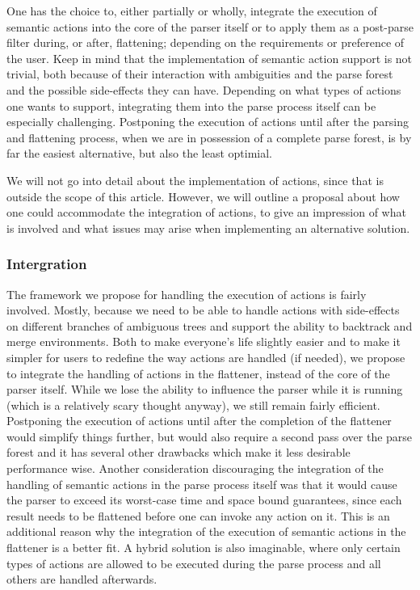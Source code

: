 \documentclass[a4paper,10pt]{article}
\begin{document}
One has the choice to, either partially or wholly, integrate the execution of semantic actions into the core of the parser itself or to apply them as a post-parse filter during, or after, flattening; depending on the requirements or preference of the user. Keep in mind that the implementation of semantic action support is not trivial, both because of their interaction with ambiguities and the parse forest and the possible side-effects they can have. Depending on what types of actions one wants to support, integrating them into the parse process itself can be especially challenging. Postponing the execution of actions until after the parsing and flattening process, when we are in possession of a complete parse forest, is by far the easiest alternative, but also the least optimial.

We will not go into detail about the implementation of actions, since that is outside the scope of this article. However, we will outline a proposal about how one could accommodate the integration of actions, to give an impression of what is involved and what issues may arise when implementing an alternative solution.

\subsubsection{Intergration}
The framework we propose for handling the execution of actions is fairly involved. Mostly, because we need to be able to handle actions with side-effects on different branches of ambiguous trees and support the ability to backtrack and merge environments. Both to make everyone's life slightly easier and to make it simpler for users to redefine the way actions are handled (if needed), we propose to integrate the handling of actions in the flattener, instead of the core of the parser itself. While we lose the ability to influence the parser while it is running (which is a relatively scary thought anyway), we still remain fairly efficient. Postponing the execution of actions until after the completion of the flattener would simplify things further, but would also require a second pass over the parse forest and it has several other drawbacks which make it less desirable performance wise. Another consideration discouraging the integration of the handling of semantic actions in the parse process itself was that it would cause the parser to exceed its worst-case time and space bound guarantees, since each result needs to be flattened before one can invoke any action on it. This is an additional reason why the integration of the execution of semantic actions in the flattener is a better fit. A hybrid solution is also imaginable, where only certain types of actions are allowed to be executed during the parse process and all others are handled afterwards.
\end{document}

